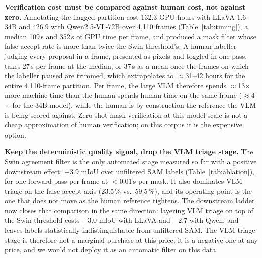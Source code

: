 \documentclass[conference]{IEEEtran}
\begin{document}
\textbf{Verification cost must be compared against human cost, not against zero.}
Annotating the flagged partition cost 132.3 GPU-hours with LLaVA-1.6-34B and 426.9 with
Qwen2.5-VL-72B over 4{,}110 frames (Table~\ref{tab:timing}), a median 109\,s and 352\,s of GPU time per
frame, and produced a mask filter whose false-accept rate is more than twice the Swin threshold's.
A human labeller judging every proposal in a frame, presented as pixels and toggled in one pass, takes
27\,s per frame at the median, or 37\,s as a mean once the frames on which the labeller paused are
trimmed, which extrapolates to $\approx$31--42 hours for the entire 4{,}110-frame partition.
Per frame, the large VLM therefore spends $\approx$13$\times$ more machine time than the human
spends human time on the same frame ($\approx$4$\times$ for the 34B model), while the human is
by construction the reference the VLM is being scored against. Zero-shot mask verification at this model scale is not a cheap approximation of human
verification; on this corpus it is the expensive option.

\textbf{Keep the deterministic quality signal, drop the VLM triage stage.}
The Swin agreement filter is the only automated stage measured so far with a positive downstream
effect: $+3.9$ mIoU over unfiltered SAM labels (Table~\ref{tab:ablation}), for one forward pass per
frame at $<$0.01\,s per mask. It also dominates VLM triage on the false-accept axis
(23.5\,\% vs.\ 59.5\,\%), and its operating point is the one that does not move as the human reference
tightens. The downstream ladder now closes that comparison in the same direction: layering VLM triage
on top of the Swin threshold costs $-3.0$ mIoU with LLaVA and $-2.7$ with Qwen, and leaves labels
statistically indistinguishable from unfiltered SAM. The VLM triage stage is therefore not a marginal
purchase at this price; it is a negative one at any price, and we would not deploy it as an automatic
filter on this data.
\end{document}
